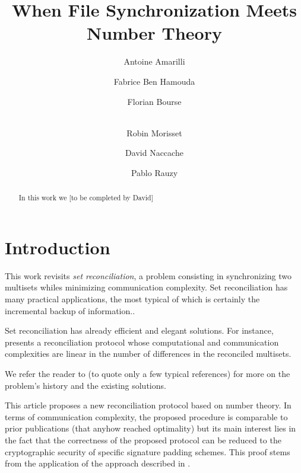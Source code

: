 \documentclass[11pt]{llncs}
\begin{document}
\title{When File Synchronization Meets Number Theory}

\author{Antoine Amarilli \and Fabrice Ben Hamouda \and Florian Bourse \and\\
Robin Morisset \and David Naccache \and Pablo Rauzy}


\maketitle

\begin{abstract}

In this work we [to be completed by David]

\end{abstract}

\section{Introduction}

This work revisits {\sl set reconciliation}, a problem consisting in synchronizing two multisets whiles minimizing communication complexity. Set reconciliation has many practical applications, the most typical of which is certainly the incremental backup of information.\smallskip.

Set reconciliation has already efficient and elegant solutions. For instance, \cite{PSRec} presents a reconciliation protocol whose computational and communication complexities are linear in the number of differences in the reconciled multisets.\smallskip

We refer the reader to \cite{PSRec,Mins1,Whats} (to quote only a few typical references) for more on the problem's history and the existing solutions.\smallskip

This article proposes a new reconciliation protocol based on number theory. In terms of communication complexity, the proposed procedure is comparable to prior publications \cite{PSRec} (that anyhow reached optimality) but its main interest lies in the fact that the correctness of the proposed protocol can be reduced to the cryptographic security of specific signature padding schemes. This proof stems from the application of the approach described in \cite{comparing}.\smallskip
\end{document}
